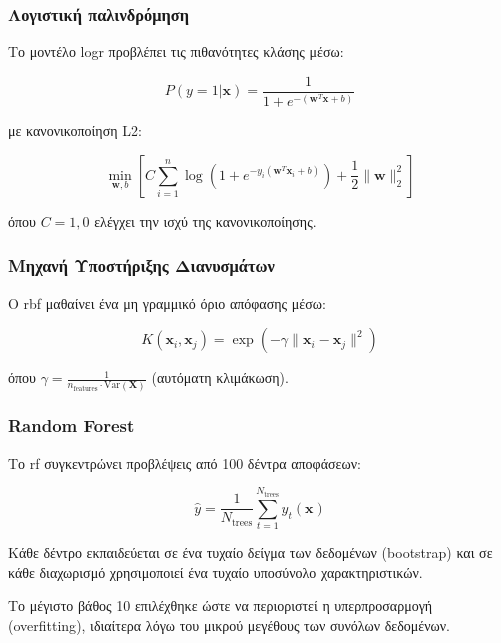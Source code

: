 \subsubsection{Λογιστική παλινδρόμηση}

Το μοντέλο \gls{logr} προβλέπει τις πιθανότητες κλάσης μέσω:

\begin{equation}
P(y=1|\mathbf{x}) = \frac{1}{1 + e^{-(\mathbf{w}^T \mathbf{x} + b)}}
\label{eq:logistic}
\end{equation}

με κανονικοποίηση L2:

\begin{equation}
\min_{\mathbf{w}, b} \left[ C \sum_{i=1}^{n} \log(1 + e^{-y_i(\mathbf{w}^T \mathbf{x}_i + b)}) + \frac{1}{2} \|\mathbf{w}\|_2^2 \right]
\label{eq:l2-regularization}
\end{equation}

όπου $C=1{,}0$ ελέγχει την ισχύ της κανονικοποίησης.

\subsubsection{Μηχανή Υποστήριξης Διανυσμάτων}

Ο \gls{rbf} μαθαίνει ένα μη γραμμικό όριο απόφασης μέσω:

\begin{equation}
K(\mathbf{x}_i, \mathbf{x}_j) = \exp\left(-\gamma \|\mathbf{x}_i - \mathbf{x}_j\|^2\right)
\label{eq:rbf-kernel}
\end{equation}

όπου $\gamma = \frac{1}{n_{\text{features}} \cdot \text{Var}(\mathbf{X})}$ (αυτόματη κλιμάκωση).

\subsubsection{Random Forest}

Το \gls{rf} συγκεντρώνει προβλέψεις από 100 δέντρα αποφάσεων:

\begin{equation}
\hat{y} = \frac{1}{N_{\text{trees}}} \sum_{t=1}^{N_{\text{trees}}} \hat{y}_t(\mathbf{x})
\label{eq:random-forest}
\end{equation}

Κάθε δέντρο εκπαιδεύεται σε ένα τυχαίο δείγμα των δεδομένων (bootstrap) και σε κάθε διαχωρισμό χρησιμοποιεί ένα τυχαίο υποσύνολο χαρακτηριστικών.

Το μέγιστο βάθος 10 επιλέχθηκε ώστε να περιοριστεί η υπερπροσαρμογή (\gls{overfitting}), ιδιαίτερα λόγω του μικρού μεγέθους των συνόλων δεδομένων.

